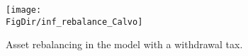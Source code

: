 \hypertarget{inf_rebalance_Calvo}{}
\begin{figure}[tbp]
\centerline{\texttt{[image: \\FigDir/inf\_rebalance\_Calvo]}}
\caption{Asset rebalancing in the model with a withdrawal tax.}
\label{fig:inf_rebalance_Calvo}
\end{figure}